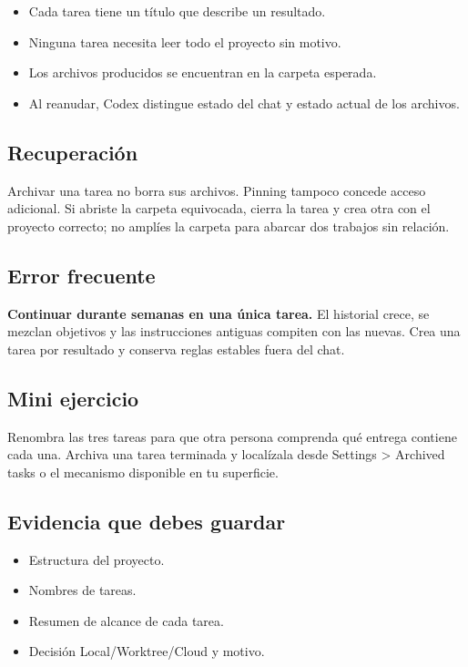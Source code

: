 \documentclass[10pt,a4paper,openany]{book}
\providecommand{\tightlist}{\setlength{\itemsep}{0.18em}\setlength{\parskip}{0pt}}
\begin{document}
\begin{itemize}
\tightlist
\item
  Cada tarea tiene un título que describe un resultado.
\item
  Ninguna tarea necesita leer todo el proyecto sin motivo.
\item
  Los archivos producidos se encuentran en la carpeta esperada.
\item
  Al reanudar, Codex distingue estado del chat y estado actual de los
  archivos.
\end{itemize}

\subsection{Recuperación}\label{recuperaciuxf3n-10}

Archivar una tarea no borra sus archivos. Pinning tampoco concede acceso
adicional. Si abriste la carpeta equivocada, cierra la tarea y crea otra
con el proyecto correcto; no amplíes la carpeta para abarcar dos
trabajos sin relación.

\subsection{Error frecuente}\label{error-frecuente-12}

\textbf{Continuar durante semanas en una única tarea.} El historial
crece, se mezclan objetivos y las instrucciones antiguas compiten con
las nuevas. Crea una tarea por resultado y conserva reglas estables
fuera del chat.

\subsection{Mini ejercicio}\label{mini-ejercicio-8}

Renombra las tres tareas para que otra persona comprenda qué entrega
contiene cada una. Archiva una tarea terminada y localízala desde
Settings \textgreater{} Archived tasks o el mecanismo disponible en tu
superficie.

\subsection{Evidencia que debes
guardar}\label{evidencia-que-debes-guardar-12}

\begin{itemize}
\tightlist
\item
  Estructura del proyecto.
\item
  Nombres de tareas.
\item
  Resumen de alcance de cada tarea.
\item
  Decisión Local/Worktree/Cloud y motivo.
\end{itemize}
\end{document}
